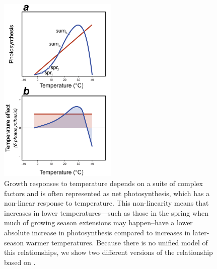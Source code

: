 \documentclass[11pt]{article}
\begin{document}
\clearpage
\begin{figure}[h!]
\includegraphics[width=0.5\textwidth]{..//figures/_figuresFromRuben/Tempresponses.png} %
\caption{Growth responses to temperature depends on a suite of complex factors and is often represented as net photosynthesis, which has a non-linear response to temperature. This non-linearity means that increases in lower temperatures---such as those in the spring when much of growing season extensions may happen--have a lower absolute increase in photosynthesis compared to increases in later-season warmer temperatures. Because there is no unified model of this relationships, we show two different versions of the relationship based on \citet{larcher2003,rezende2019thermal}.}
\label{fig:temperaturecomplex}
\end{figure}
\end{document}

